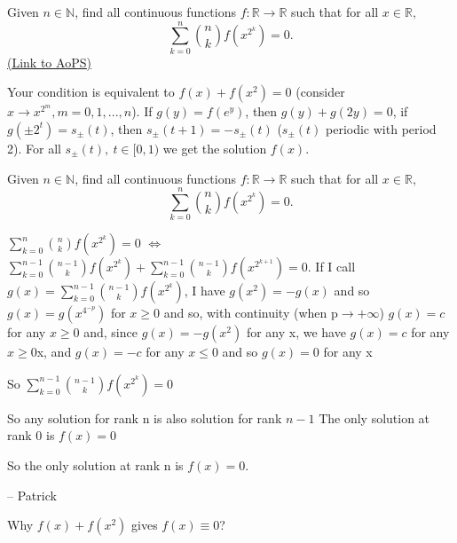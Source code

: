 \begin{problem}
	Given $n \in\mathbb{N}$, ﬁnd all continuous functions $f : \mathbb{R}\to \mathbb{R}$ such that for all $x\in\mathbb{R},$
\[\sum_{k=0}^{n}\binom{n}{k}f(x^{2^{k}})=0. \]
	\flushright \href{https://artofproblemsolving.com/community/c6h148365}{(Link to AoPS)}
\end{problem}



\begin{mysolution}
	Your condition is equivalent to $f(x)+f(x^{2})=0$ (consider $x\to x^{2^{m}}, m=0,1,...,n$).
If $g(y)=f(e^{y})$, then $g(y)+g(2y)=0$, if $g(\pm 2^{t})=s_{\pm}(t)$, then $s_{\pm}(t+1)=-s_{\pm}(t)$ ($s_{\pm}(t)$ periodic with period 2).
For all $s_{\pm}(t), \ t\in [0,1)$ we get the solution $f(x)$.
\end{mysolution}



\begin{mysolution}
	\begin{tcolorbox}Given $n \in\mathbb{N}$, ﬁnd all continuous functions $f : \mathbb{R}\to \mathbb{R}$ such that for all $x\in\mathbb{R},$
\[\sum_{k=0}^{n}\binom{n}{k}f(x^{2^{k}})=0. \]
\end{tcolorbox}

$\sum_{k=0}^{n}\binom{n}{k}f(x^{2^{k}})=0$ $\Leftrightarrow$ $\sum_{k=0}^{n-1}\binom{n-1}{k}f(x^{2^{k}})+\sum_{k=0}^{n-1}\binom{n-1}{k}f(x^{2^{k+1}})=0$.
If I call $g(x)=\sum_{k=0}^{n-1}\binom{n-1}{k}f(x^{2^{k}})$, I have $g(x^{2})=-g(x)$ and so $g(x)=g(x^{4^{-p}})$ for $x\geq 0$ and so, with continuity (when p$\rightarrow+\infty$) $g(x)=c$ for any $x\geq 0$ and, since $g(x)=-g(x^{2})$ for any x, we have $g(x)=c$ for any $x\geq 0$x, and $g(x)=-c$ for any $x\leq 0$ and so $g(x)=0$ for any x

So $\sum_{k=0}^{n-1}\binom{n-1}{k}f(x^{2^{k}})=0$

So any solution for rank n is also solution for rank $n-1$
The only solution at rank 0 is $f(x)=0$

So the only solution at rank n is $f(x)=0$.

-- 
Patrick
\end{mysolution}



\begin{mysolution}
	Why $f(x)+f(x^{2})$ gives $f(x)\equiv 0$?
\end{mysolution}



